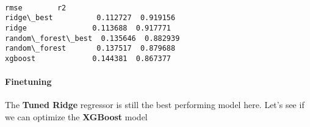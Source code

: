 \documentclass[11pt]{article}
\makeatletter
\newcommand{\boxspacing}{\kern\kvtcb@left@rule\kern\kvtcb@boxsep}
\newcommand{\prompt}[4]{
        {\ttfamily\llap{{\color{#2}[#3]:\hspace{3pt}#4}}\vspace{-\baselineskip}}
    }
\makeatother
\begin{document}
    \begin{center}
    \end{center}
    { \hspace*{\fill} \\}
    
            \begin{tcolorbox}[breakable, size=fbox, boxrule=.5pt, pad at break*=1mm, opacityfill=0]
\prompt{Out}{outcolor}{32}{\boxspacing}
\begin{Verbatim}[commandchars=\\\{\}]
                        rmse        r2
ridge\_best          0.112727  0.919156
ridge               0.113688  0.917771
random\_forest\_best  0.135646  0.882939
random\_forest       0.137517  0.879688
xgboost             0.144381  0.867377
\end{Verbatim}
\end{tcolorbox}
        
    \paragraph{Finetuning}\label{finetuning}

    The \textbf{Tuned Ridge} regressor is still the best performing model
here. Let's see if we can optimize the \textbf{XGBoost} model
\end{document}
